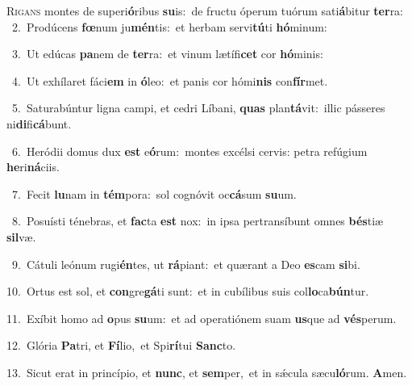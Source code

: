 \lettrine{\initial\textcolor{\initialcolor}{R}}{igans} montes de superi\-\textbf{ó}\-ribus \textbf{su}\-is:~\star de fructu óperum tuórum sati\-\textbf{á}\-bitur \textbf{ter}\-ra:\\
{\numbfont\textcolor{\numbcolor}{~2.}}~Prodúcens \textbf{fœ}\-num ju\-\textbf{mén}\-tis:~\star et herbam servi\-\textbf{tú}\-ti \textbf{hó}\-minum:\par
{\numbfont\textcolor{\numbcolor}{~3.}}~Ut edúcas \textbf{pa}\-nem de \textbf{ter}\-ra:~\star et vinum lætífi\textbf{cet} cor \textbf{hó}\-minis:\par
{\numbfont\textcolor{\numbcolor}{~4.}}~Ut exhílaret fáci\textbf{em} in \textbf{ó}\-leo:~\star et panis cor hómi\textbf{nis} con\-\textbf{fír}\-met.\par
{\numbfont\textcolor{\numbcolor}{~5.}}~Saturabúntur ligna campi, et cedri Líbani, \textbf{quas} plan\-\textbf{tá}\-vit:~\star illic pásseres ni\-\textbf{di}\-fi\-\textbf{cá}\-bunt.\par
{\numbfont\textcolor{\numbcolor}{~6.}}~Heródii domus dux \textbf{est} e\-\textbf{ó}\-rum:~\star montes excélsi cervis: petra refúgium \textbf{he}\-ri\-\textbf{ná}\-ciis.\par
{\numbfont\textcolor{\numbcolor}{~7.}}~Fecit \textbf{lu}\-nam in \textbf{tém}\-pora:~\star sol cognóvit oc\-\textbf{cá}\-sum \textbf{su}\-um.\par
{\numbfont\textcolor{\numbcolor}{~8.}}~Posuísti ténebras, et \textbf{fac}\-ta \textbf{est} nox:~\star in ipsa pertransíbunt omnes \textbf{bés}\-tiæ \textbf{sil}\-væ.\par
{\numbfont\textcolor{\numbcolor}{~9.}}~Cátuli leónum rugi\-\textbf{én}\-tes, ut \textbf{rá}\-piant:~\star et quærant a Deo \textbf{es}\-cam \textbf{si}\-bi.\par
{\numbfont\textcolor{\numbcolor}{10.}}~Ortus est sol, et \textbf{con}\-gre\-\textbf{gá}\-ti sunt:~\star et in cubílibus suis col\-\textbf{lo}\-ca\-\textbf{bún}\-tur.\par
{\numbfont\textcolor{\numbcolor}{11.}}~Exíbit homo ad \textbf{o}\-pus \textbf{su}\-um:~\star et ad operatiónem suam \textbf{us}\-que ad \textbf{vés}\-perum.\par
{\numbfont\textcolor{\numbcolor}{12.}}~Glória \textbf{Pa}\-tri, et \textbf{Fí}\-lio,~\star et Spi\-\textbf{rí}\-tui \textbf{Sanc}\-to.\par
{\numbfont\textcolor{\numbcolor}{13.}}~Sicut erat in princípio, et \textbf{nunc}\-, et \textbf{sem}\-per,~\star et in sǽcula sæcu\-\textbf{ló}\-rum. \textbf{A}\-men.\par
